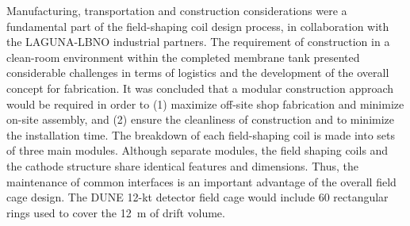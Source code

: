 Manufacturing, transportation and construction considerations were a fundamental
part of the field-shaping coil design process, in
collaboration with the LAGUNA-LBNO industrial partners.
The requirement of construction in a clean-room environment within the completed membrane tank
 presented considerable challenges in
terms of logistics and the development of the overall concept for
fabrication.  It was concluded that a modular construction approach
would be required in order to  (1) maximize off-site shop fabrication and
minimize on-site assembly, %
and (2) ensure the cleanliness of construction and to
minimize the installation time. 
The breakdown of each field-shaping
coil is made into sets of three main modules.  Although separate modules,
the field shaping coils and the cathode structure share identical
features and dimensions.  Thus, the maintenance of common interfaces
is an important advantage %
of the overall %
field cage design. %
The DUNE  12-kt detector field cage would %
include 60 rectangular rings used to cover the
12~m of drift volume.

